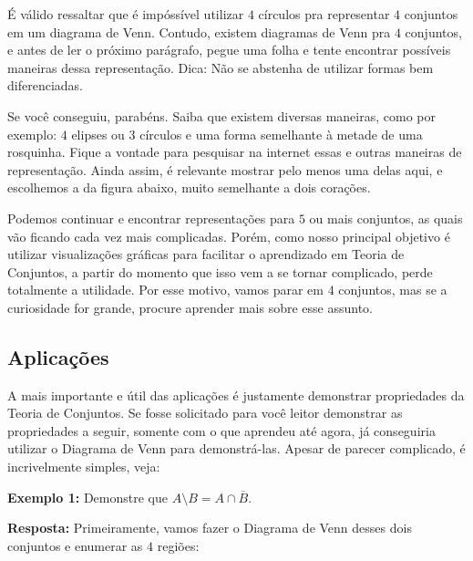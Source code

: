 É válido ressaltar que é impóssível utilizar $4$ círculos pra representar $4$ conjuntos em um diagrama de Venn. Contudo, existem diagramas de Venn pra $4$ conjuntos, e antes de ler o próximo parágrafo, pegue uma folha e tente encontrar possíveis maneiras dessa representação. Dica: Não se abstenha de utilizar formas bem diferenciadas.

Se você conseguiu, parabéns. Saiba que existem diversas maneiras, como por exemplo: $4$ elipses ou $3$ círculos e uma forma semelhante à metade de uma rosquinha. Fique a vontade para pesquisar na internet essas e outras maneiras de representação. Ainda assim, é relevante mostrar pelo menos uma delas aqui, e escolhemos a da figura abaixo, muito semelhante a dois corações.


Podemos continuar e encontrar representações para $5$ ou mais conjuntos, as quais vão ficando cada vez mais complicadas. Porém, como nosso principal objetivo é utilizar visualizações gráficas para facilitar o aprendizado em Teoria de Conjuntos, a partir do momento que isso vem a se tornar complicado, perde totalmente a utilidade. Por esse motivo, vamos parar em $4$ conjuntos, mas se a curiosidade for grande, procure aprender mais sobre esse assunto.

\subsection{Aplicações}
A mais importante e útil das aplicações é justamente demonstrar propriedades da Teoria de Conjuntos. Se fosse solicitado para você leitor demonstrar as propriedades a seguir, somente com o que aprendeu até agora, já conseguiria utilizar o Diagrama de Venn para demonstrá-las. Apesar de parecer complicado, é incrivelmente simples, veja:

\textbf{Exemplo 1:} Demonstre que $A \setminus B = A \cap \overline B$.

\textbf{Resposta:} Primeiramente, vamos fazer o Diagrama de Venn desses dois conjuntos e enumerar as $4$ regiões:


